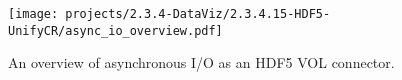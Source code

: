 
\begin{wrapfigure}[22]{r}{0.51\textwidth}
  \begin{center}
    \texttt{[image: projects/2.3.4-DataViz/2.3.4.15-HDF5-UnifyCR/async\_io\_overview.pdf]}
  \end{center}
  \caption{An overview of asynchronous I/O as an HDF5 VOL connector.}
  \label{fig:asyncio-overview}
\end{wrapfigure}


